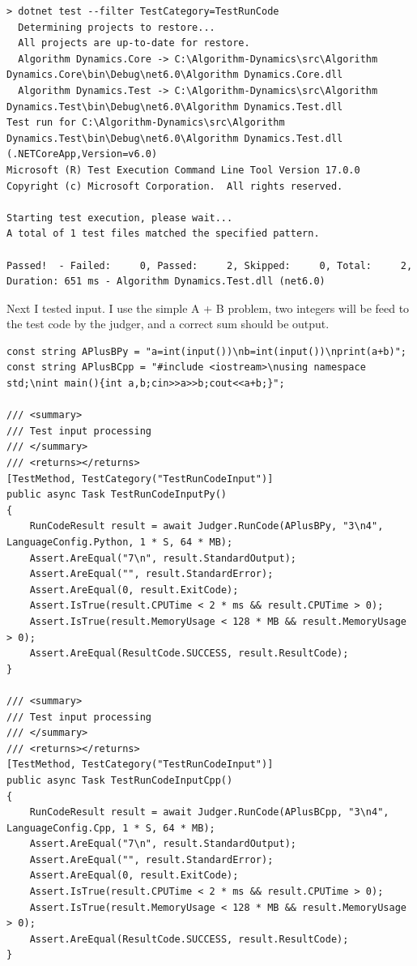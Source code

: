 \documentclass[a4paper]{report}
\begin{document}
\begin{verbatim}
> dotnet test --filter TestCategory=TestRunCode
  Determining projects to restore...
  All projects are up-to-date for restore.
  Algorithm Dynamics.Core -> C:\Algorithm-Dynamics\src\Algorithm Dynamics.Core\bin\Debug\net6.0\Algorithm Dynamics.Core.dll
  Algorithm Dynamics.Test -> C:\Algorithm-Dynamics\src\Algorithm Dynamics.Test\bin\Debug\net6.0\Algorithm Dynamics.Test.dll
Test run for C:\Algorithm-Dynamics\src\Algorithm Dynamics.Test\bin\Debug\net6.0\Algorithm Dynamics.Test.dll (.NETCoreApp,Version=v6.0)
Microsoft (R) Test Execution Command Line Tool Version 17.0.0
Copyright (c) Microsoft Corporation.  All rights reserved.

Starting test execution, please wait...
A total of 1 test files matched the specified pattern.

Passed!  - Failed:     0, Passed:     2, Skipped:     0, Total:     2, Duration: 651 ms - Algorithm Dynamics.Test.dll (net6.0)
\end{verbatim}

Next I tested input. I use the simple A + B problem, two integers will be feed to the test code by the judger, and a correct sum should be output.

\begin{verbatim}
const string APlusBPy = "a=int(input())\nb=int(input())\nprint(a+b)";
const string APlusBCpp = "#include <iostream>\nusing namespace std;\nint main(){int a,b;cin>>a>>b;cout<<a+b;}";

/// <summary>
/// Test input processing
/// </summary>
/// <returns></returns>
[TestMethod, TestCategory("TestRunCodeInput")]
public async Task TestRunCodeInputPy()
{
    RunCodeResult result = await Judger.RunCode(APlusBPy, "3\n4", LanguageConfig.Python, 1 * S, 64 * MB);
    Assert.AreEqual("7\n", result.StandardOutput);
    Assert.AreEqual("", result.StandardError);
    Assert.AreEqual(0, result.ExitCode);
    Assert.IsTrue(result.CPUTime < 2 * ms && result.CPUTime > 0);
    Assert.IsTrue(result.MemoryUsage < 128 * MB && result.MemoryUsage > 0);
    Assert.AreEqual(ResultCode.SUCCESS, result.ResultCode);
}

/// <summary>
/// Test input processing
/// </summary>
/// <returns></returns>
[TestMethod, TestCategory("TestRunCodeInput")]
public async Task TestRunCodeInputCpp()
{
    RunCodeResult result = await Judger.RunCode(APlusBCpp, "3\n4", LanguageConfig.Cpp, 1 * S, 64 * MB);
    Assert.AreEqual("7\n", result.StandardOutput);
    Assert.AreEqual("", result.StandardError);
    Assert.AreEqual(0, result.ExitCode);
    Assert.IsTrue(result.CPUTime < 2 * ms && result.CPUTime > 0);
    Assert.IsTrue(result.MemoryUsage < 128 * MB && result.MemoryUsage > 0);
    Assert.AreEqual(ResultCode.SUCCESS, result.ResultCode);
}
\end{verbatim}
\end{document}
